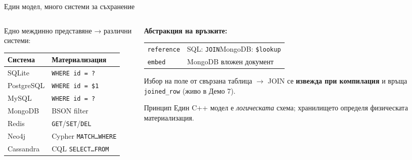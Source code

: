 \documentclass[aspectratio=169,12pt]{beamer}
\begin{document}
\begin{frame}{Един модел, много системи за съхранение}
    \begin{columns}[T]
        \begin{column}{0.50\textwidth}
            {\small Едно междинно представяне → различни системи:}
            \begin{tabularx}{\linewidth}{@{}lX@{}}
                \toprule
                \textbf{Система}  & \textbf{Материализация}\\
                \midrule
                SQLite      & \texttt{WHERE id = ?}\\
                PostgreSQL  & \texttt{WHERE id = \$1}\\
                MySQL       & \texttt{WHERE id = ?}\\
                \midrule
                MongoDB     & BSON filter\\
                Redis       & \texttt{GET}/\texttt{SET}/\texttt{DEL}\\
                Neo4j       & Cypher \texttt{MATCH…WHERE}\\
                Cassandra   & CQL \texttt{SELECT…FROM}\\
                \bottomrule
            \end{tabularx}
        \end{column}
        \begin{column}{0.47\textwidth}
            \textbf{Абстракция на връзките:}\\[0.1em]
            \begin{tabularx}{\linewidth}{@{}lX@{}}
                \texttt{reference} & SQL: \texttt{JOIN}\quad MongoDB: \texttt{\$lookup}\\
                \texttt{embed}     & MongoDB вложен документ\\
            \end{tabularx}
            \vspace{0.1em}
            {\footnotesize Избор на поле от свързана таблица $\rightarrow$ JOIN се
            \textbf{извежда при компилация} и връща \texttt{joined\_row} (живо в Демо 7).}
            \vspace{0.1em}
            \begin{alertblock}{Принцип}
                {\small Един C++ модел е \emph{логическата} схема; хранилището определя
                физическата материализация.}
            \end{alertblock}
        \end{column}
    \end{columns}
\end{frame}
\end{document}
